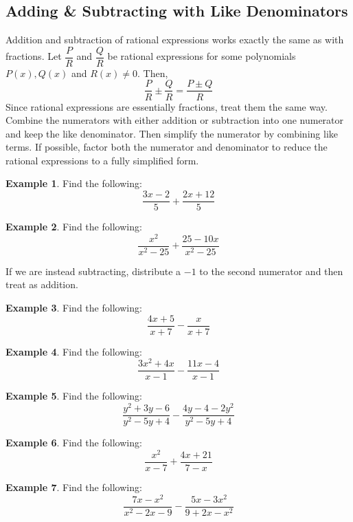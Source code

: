 \documentclass[addpoints,12pt]{exam}
\theoremstyle{definition}
\newtheorem{example}{Example}[subsection]
\begin{document}
\setcounter{section}{7}
\setcounter{subsection}{2}

\subsection{Adding \& Subtracting with Like Denominators}

\noindent Addition and subtraction of rational expressions works exactly the same as with fractions.
\vspace{.25in}
\noindent Let $\dfrac{P}{R}$ and $\dfrac{Q}{R}$ be rational expressions for some polynomials $P(x), Q(x)$ and $R(x)\neq 0$. Then, \[\dfrac{P}{R} \pm \dfrac{Q}{R} = \dfrac{P\pm Q}{R}\]
\vspace{.25in}
\noindent Since rational expressions are essentially fractions, treat them the same way. Combine the numerators with either addition or subtraction into one numerator and keep the like denominator. Then simplify the numerator by combining like terms. If possible, factor both the numerator and denominator to reduce the rational expressions to a fully simplified form.

\begin{example}
Find the following: \[\dfrac{3x-2}{5} + \dfrac{2x+12}{5}\]
\vspace{2in}
\end{example}

\newpage

\begin{example}
Find the following: \[\dfrac{x^2}{x^2-25}+\dfrac{25-10x}{x^2-25}\]
\vspace{3.25in}
\end{example}

\noindent If we are instead subtracting, distribute a $-1$ to the second numerator and then treat as addition.
\vspace{.15in}
\begin{example}
Find the following: \[\dfrac{4x+5}{x+7} - \dfrac{x}{x+7}\]
\end{example}

\newpage

\begin{example}
Find the following: \[\dfrac{3x^2 + 4x}{x-1} - \dfrac{11x-4}{x-1}\]
\vspace{3in}
\end{example}

\begin{example}
Find the following: \[\dfrac{y^2+3y-6}{y^2 - 5y + 4} - \dfrac{4y-4-2y^2}{y^2-5y+4}\]
\end{example}

\newpage

\begin{example}
Find the following: \[\dfrac{x^2}{x-7} + \dfrac{4x+21}{7-x}\]
\vspace{3in}
\end{example}

\begin{example}
Find the following: \[\dfrac{7x-x^2}{x^2-2x-9}-\dfrac{5x-3x^2}{9+2x-x^2}\]
\end{example}
\end{document}
